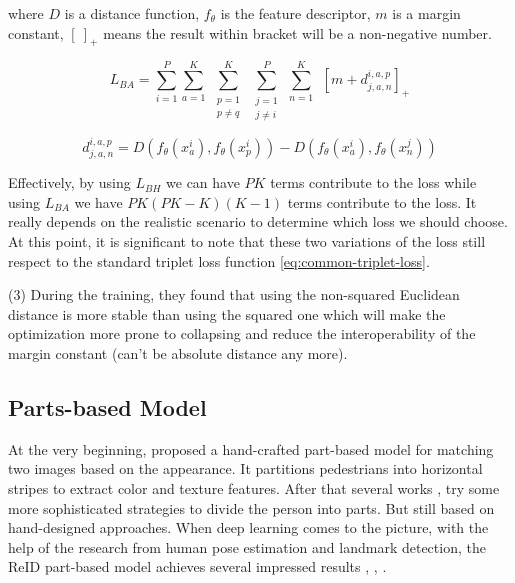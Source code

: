 where $D$ is a distance function, $f_\theta$ is the feature descriptor, $m$ is a margin constant, $[\:]_+$ means the result within bracket will
be a non-negative number.

\begin{equation}
\label{eq:batch-all}
    L_{BA} = \sum_{i=1}^{P} \sum_{a=1}^{K}  \:
             \sum_{\substack{p=1\\ p\neq q}}^{K} \:
             \sum_{\substack{j=1\\ j \neq i}}^{P} \:
             \sum_{n=1}^{K} \:\:
             [m + d_{j, a, n}^{i, a, p}]_+
\end{equation}

$$d_{j, a, n}^{i, a, p} =  D(f_{\theta}(x_{a}^i), f_{\theta}(x_{p}^i)) - D(f_{\theta}(x_{a}^i), f_{\theta}(x_{n}^j))$$

Effectively, by using $L_{BH}$ we can have $PK$ terms contribute to the loss while using $L_{BA}$ we have $PK(PK - K)(K - 1)$ terms
contribute to the loss. It really depends on the realistic scenario to determine which loss we should choose. At this point, it is
significant to note that these two variations of the loss still respect to the standard triplet loss function \autoref{eq:common-triplet-loss}.

(3) During the training, they found that using the non-squared Euclidean distance is more stable than using the squared one which will make the
optimization more prone to collapsing and reduce the interoperability of the margin constant (can't be absolute distance any more).

\subsection{Parts-based Model}

At the very beginning, \cite{hand-crafted-part-based} proposed a hand-crafted part-based model for matching two images based
on the appearance. It partitions pedestrians into horizontal stripes to extract color and texture features. After that several
works \cite{part-based-triangle}, \cite{part-based-pictorial-structure} try some more sophisticated strategies to divide the
person into parts. But still based on hand-designed approaches. When deep learning comes to the picture, with the help of the
research from human pose estimation and landmark detection, the ReID part-based model achieves several impressed results
\cite{deep-part-based-glad}, \cite{pose-driven-dcnn-for-reid}, \cite{pose-invariant-embedding-for-reid}.

